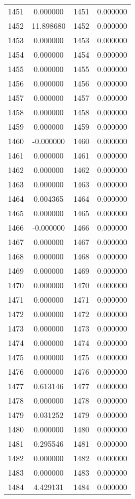 \documentclass[12pt]{article}
\begin{document}
\begin{longtable}{@{}cccc@{}}
1451 & 0.000000 & 1451 & 0.000000 \\
1452 & 11.898680 & 1452 & 0.000000 \\
1453 & 0.000000 & 1453 & 0.000000 \\
1454 & 0.000000 & 1454 & 0.000000 \\
1455 & 0.000000 & 1455 & 0.000000 \\
1456 & 0.000000 & 1456 & 0.000000 \\
1457 & 0.000000 & 1457 & 0.000000 \\
1458 & 0.000000 & 1458 & 0.000000 \\
1459 & 0.000000 & 1459 & 0.000000 \\
1460 & -0.000000 & 1460 & 0.000000 \\
1461 & 0.000000 & 1461 & 0.000000 \\
1462 & 0.000000 & 1462 & 0.000000 \\
1463 & 0.000000 & 1463 & 0.000000 \\
1464 & 0.004365 & 1464 & 0.000000 \\
1465 & 0.000000 & 1465 & 0.000000 \\
1466 & -0.000000 & 1466 & 0.000000 \\
1467 & 0.000000 & 1467 & 0.000000 \\
1468 & 0.000000 & 1468 & 0.000000 \\
1469 & 0.000000 & 1469 & 0.000000 \\
1470 & 0.000000 & 1470 & 0.000000 \\
1471 & 0.000000 & 1471 & 0.000000 \\
1472 & 0.000000 & 1472 & 0.000000 \\
1473 & 0.000000 & 1473 & 0.000000 \\
1474 & 0.000000 & 1474 & 0.000000 \\
1475 & 0.000000 & 1475 & 0.000000 \\
1476 & 0.000000 & 1476 & 0.000000 \\
1477 & 0.613146 & 1477 & 0.000000 \\
1478 & 0.000000 & 1478 & 0.000000 \\
1479 & 0.031252 & 1479 & 0.000000 \\
1480 & 0.000000 & 1480 & 0.000000 \\
1481 & 0.295546 & 1481 & 0.000000 \\
1482 & 0.000000 & 1482 & 0.000000 \\
1483 & 0.000000 & 1483 & 0.000000 \\
1484 & 4.429131 & 1484 & 0.000000 \\

\end{longtable}
\end{document}
